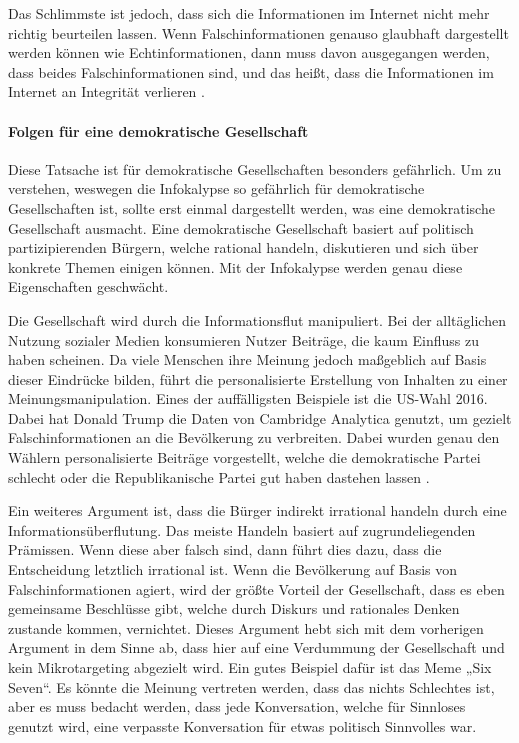 \documentclass[11pt]{article}
\begin{document}
Das Schlimmste ist jedoch, dass sich die Informationen im Internet nicht mehr richtig beurteilen lassen. Wenn Falschinformationen genauso glaubhaft dargestellt werden können wie Echtinformationen, dann muss davon ausgegangen werden, dass beides Falschinformationen sind, und das heißt, dass die Informationen im Internet an Integrität verlieren \cite{info}.


\paragraph{Folgen für eine demokratische Gesellschaft}
Diese Tatsache ist für demokratische Gesellschaften besonders gefährlich. Um zu verstehen, weswegen die Infokalypse so gefährlich für demokratische Gesellschaften ist, sollte erst einmal dargestellt werden, was eine demokratische Gesellschaft ausmacht. Eine demokratische Gesellschaft basiert auf politisch partizipierenden Bürgern, welche rational handeln, diskutieren und sich über konkrete Themen einigen können. Mit der Infokalypse werden genau diese Eigenschaften geschwächt. 

Die Gesellschaft wird durch die Informationsflut manipuliert. Bei der alltäglichen Nutzung sozialer Medien konsumieren Nutzer Beiträge, die kaum Einfluss zu haben scheinen. Da viele Menschen ihre Meinung jedoch maßgeblich auf Basis dieser Eindrücke bilden, führt die personalisierte Erstellung von Inhalten zu einer Meinungsmanipulation. Eines der auffälligsten Beispiele ist die US-Wahl 2016. Dabei hat Donald Trump die Daten von Cambridge Analytica genutzt, um gezielt Falschinformationen an die Bevölkerung zu verbreiten. Dabei wurden genau den Wählern personalisierte Beiträge vorgestellt, welche die demokratische Partei schlecht oder die Republikanische Partei gut haben dastehen lassen \cite{lewis_leaked_2018}.

Ein weiteres Argument ist, dass die Bürger indirekt irrational handeln durch eine Informationsüberflutung. Das meiste Handeln basiert auf zugrundeliegenden Prämissen. Wenn diese aber falsch sind, dann führt dies dazu, dass die Entscheidung letztlich irrational ist. Wenn die Bevölkerung auf Basis von Falschinformationen agiert, wird der größte Vorteil der Gesellschaft, dass es eben gemeinsame Beschlüsse gibt, welche durch Diskurs und rationales Denken zustande kommen, vernichtet. Dieses Argument hebt sich mit dem vorherigen Argument in dem Sinne ab, dass hier auf eine Verdummung der Gesellschaft und kein Mikrotargeting abgezielt wird. Ein gutes Beispiel dafür ist das Meme „Six Seven“. Es könnte die Meinung vertreten werden, dass das nichts Schlechtes ist, aber es muss bedacht werden, dass jede Konversation, welche für Sinnloses genutzt wird, eine verpasste Konversation für etwas politisch Sinnvolles war. 
\end{document}
